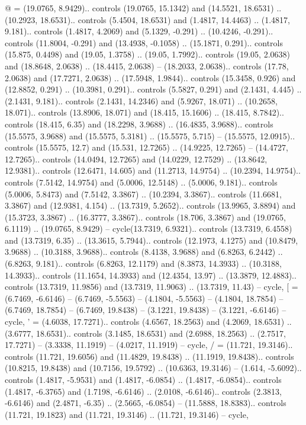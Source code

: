 {@} = {(19.0765, 8.9429).. controls (19.0765, 15.1342) and (14.5521, 18.6531) .. (10.2923, 18.6531).. controls (5.4504, 18.6531) and (1.4817, 14.4463) .. (1.4817, 9.181).. controls (1.4817, 4.2069) and (5.1329, -0.291) .. (10.4246, -0.291).. controls (11.8004, -0.291) and (13.4938, -0.1058) .. (15.1871, 0.291).. controls (15.875, 0.4498) and (19.05, 1.3758) .. (19.05, 1.7992).. controls (19.05, 2.0638) and (18.8648, 2.0638) .. (18.4415, 2.0638) -- (18.2033, 2.0638).. controls (17.78, 2.0638) and (17.7271, 2.0638) .. (17.5948, 1.9844).. controls (15.3458, 0.926) and (12.8852, 0.291) .. (10.3981, 0.291).. controls (5.5827, 0.291) and (2.1431, 4.445) .. (2.1431, 9.181).. controls (2.1431, 14.2346) and (5.9267, 18.071) .. (10.2658, 18.071).. controls (13.8906, 18.071) and (18.415, 15.1606) .. (18.415, 8.7842).. controls (18.415, 6.35) and (18.2298, 3.9688) .. (16.4835, 3.9688).. controls (15.5575, 3.9688) and (15.5575, 5.3181) .. (15.5575, 5.715) -- (15.5575, 12.0915).. controls (15.5575, 12.7) and (15.531, 12.7265) .. (14.9225, 12.7265) -- (14.4727, 12.7265).. controls (14.0494, 12.7265) and (14.0229, 12.7529) .. (13.8642, 12.9381).. controls (12.6471, 14.605) and (11.2713, 14.9754) .. (10.2394, 14.9754).. controls (7.5142, 14.9754) and (5.0006, 12.5148) .. (5.0006, 9.181).. controls (5.0006, 5.8473) and (7.5142, 3.3867) .. (10.2394, 3.3867).. controls (11.6681, 3.3867) and (12.9381, 4.154) .. (13.7319, 5.2652).. controls (13.9965, 3.8894) and (15.3723, 3.3867) .. (16.3777, 3.3867).. controls (18.706, 3.3867) and (19.0765, 6.1119) .. (19.0765, 8.9429) -- cycle(13.7319, 6.9321).. controls (13.7319, 6.4558) and (13.7319, 6.35) .. (13.3615, 5.7944).. controls (12.1973, 4.1275) and (10.8479, 3.9688) .. (10.3188, 3.9688).. controls (8.4138, 3.9688) and (6.8263, 6.2442) .. (6.8263, 9.181).. controls (6.8263, 12.1179) and (8.3873, 14.3933) .. (10.3188, 14.3933).. controls (11.1654, 14.3933) and (12.4354, 13.97) .. (13.3879, 12.4883).. controls (13.7319, 11.9856) and (13.7319, 11.9063) .. (13.7319, 11.43) -- cycle},
{[} = {(6.7469, -6.6146) -- (6.7469, -5.5563) -- (4.1804, -5.5563) -- (4.1804, 18.7854) -- (6.7469, 18.7854) -- (6.7469, 19.8438) -- (3.1221, 19.8438) -- (3.1221, -6.6146) -- cycle},
{'} = {(4.6038, 17.7271).. controls (4.6567, 18.2563) and (4.2069, 18.6531) .. (3.6777, 18.6531).. controls (3.1485, 18.6531) and (2.6988, 18.2563) .. (2.7517, 17.7271) -- (3.3338, 11.1919) -- (4.0217, 11.1919) -- cycle},
{/} = {(11.721, 19.3146).. controls (11.721, 19.6056) and (11.4829, 19.8438) .. (11.1919, 19.8438).. controls (10.8215, 19.8438) and (10.7156, 19.5792) .. (10.6363, 19.3146) -- (1.614, -5.6092).. controls (1.4817, -5.9531) and (1.4817, -6.0854) .. (1.4817, -6.0854).. controls (1.4817, -6.3765) and (1.7198, -6.6146) .. (2.0108, -6.6146).. controls (2.3813, -6.6146) and (2.4871, -6.35) .. (2.5665, -6.0854) -- (11.5888, 18.8383).. controls (11.721, 19.1823) and (11.721, 19.3146) .. (11.721, 19.3146) -- cycle},

